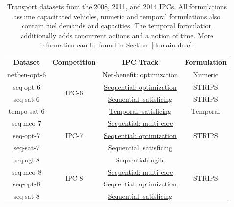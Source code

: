 \begin{table}[tb]
\centering
\begin{tabular}{c||ccc}
\textbf{Dataset} & \textbf{Competition} & \textbf{IPC Track} & \textbf{Formulation} \\ 
\midrule
\midrule
netben-opt-6 & \multirow{4}{*}{IPC-6} & \href{http://icaps-conference.org/ipc2008/deterministic/NetBenefitOptimization.html}{Net-benefit: optimization} & Numeric \\ 
seq-opt-6 & & \href{http://icaps-conference.org/ipc2008/deterministic/SequentialOptimization.html}{Sequential: optimization} & STRIPS \\ 
seq-sat-6 & & \href{http://icaps-conference.org/ipc2008/deterministic/SequentialSatisficing.html}{Sequential: satisficing} & STRIPS \\ 
tempo-sat-6 & & \href{http://icaps-conference.org/ipc2008/deterministic/TemporalSatisficing.html}{Temporal: satisficing} & Temporal \\ 
\midrule
seq-mco-7 & \multirow{3}{*}{IPC-7} & \href{http://www.plg.inf.uc3m.es/ipc2011-deterministic/SequentialMulticore.html}{Sequential: multi-core} & \multirow{3}{*}{STRIPS} \\ 
seq-opt-7 & & \href{http://www.plg.inf.uc3m.es/ipc2011-deterministic/SequentialOptimization.html}{Sequential: optimization} &  \\ 
seq-sat-7 & & \href{http://www.plg.inf.uc3m.es/ipc2011-deterministic/SequentialSatisficing.html}{Sequential: satisficing} &  \\ 
\midrule
seq-agl-8 & \multirow{4}{*}{IPC-8} & \href{https://helios.hud.ac.uk/scommv/IPC-14/seqagi.html}{Sequential: agile} & \multirow{4}{*}{STRIPS} \\ 
seq-mco-8 & & \href{https://helios.hud.ac.uk/scommv/IPC-14/seqmulti.html}{Sequential: multi-core} &  \\ 
seq-opt-8 & & \href{https://helios.hud.ac.uk/scommv/IPC-14/seqopt.html}{Sequential: optimization} &  \\ 
seq-sat-8 & & \href{https://helios.hud.ac.uk/scommv/IPC-14/seqsat.html}{Sequential: satisficing} &  \\ 
\end{tabular}
\caption[Transport datasets from the 2008, 2011, and 2014 IPCs.]{Transport datasets from the 2008, 2011, and 2014 IPCs. All formulations assume capacitated vehicles, numeric and temporal formulations also contain fuel demands and capacities. The temporal formulation additionally adds concurrent actions and a notion of time. More information can be found in Section~\ref{domain-desc}.}
\label{tab:ipc-datasets}
\end{table}

